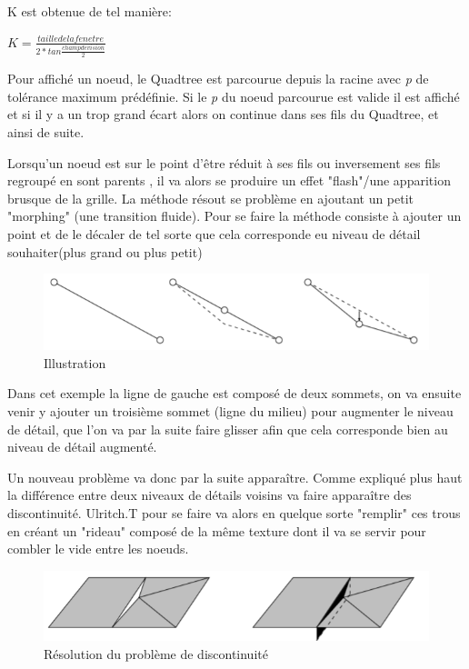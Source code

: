   K est obtenue de tel manière: 

  {\Large
\begin{center}
  \begin{math}
  K=\frac{tailledelafenetre}{2*tan\frac{champdevision}{2}}
  \end{math}
 \end{center}
 }
 
 Pour affiché un noeud, le Quadtree est parcourue depuis la racine avec \emph{p} de tolérance maximum prédéfinie. Si le \emph{p} du noeud parcourue est valide il est affiché et si il y a un trop grand écart alors on continue dans ses fils du Quadtree, et ainsi de suite.
 
 Lorsqu'un noeud est sur le point d'être réduit à ses fils ou inversement ses fils regroupé en sont parents , il va alors se produire un effet "flash"/une apparition brusque de la grille. La méthode résout se problème en ajoutant un petit "morphing" (une transition fluide). Pour se faire la méthode consiste à ajouter un point et de le décaler de tel sorte que cela corresponde eu niveau de détail souhaiter(plus grand ou plus petit)
 
 
 \begin{figure}[!ht]
    \includegraphics[width=12cm]{img/morph.png}
    \caption[morph]{ Illustration \protect\footnotemark}
    \label{fig:morph-pop}
\end{figure}

Dans cet exemple la ligne de gauche est composé de deux sommets, on va ensuite venir y ajouter un troisième sommet (ligne du milieu) pour augmenter le niveau de détail, que l'on va par la suite faire glisser afin que cela corresponde bien au niveau de détail augmenté.

Un nouveau problème va donc par la suite apparaître. Comme expliqué plus haut la différence entre deux niveaux de détails voisins va faire apparaître des discontinuité. Ulritch.T pour se faire va alors en quelque sorte "remplir" ces trous en créant un "rideau" composé de la même texture dont il va se servir pour combler le vide entre les noeuds.

 \begin{figure}[!ht]
    \includegraphics[width=12cm]{img/skirt.png}
    \caption[morph]{ Résolution du problème de discontinuité \protect\footnotemark}
    \label{fig:skirt}
\end{figure}

